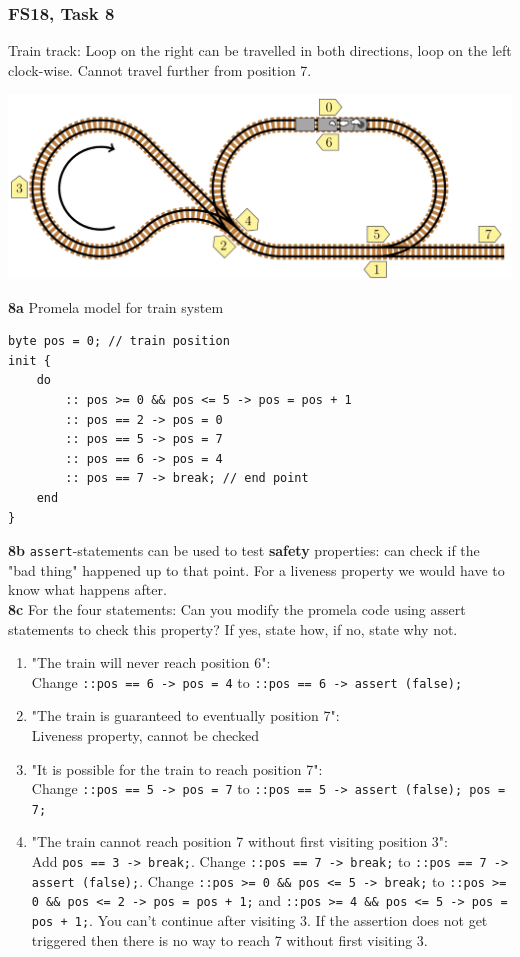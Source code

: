 \documentclass{article}
\begin{document}
\subsubsection{FS18, Task 8}
Train track: Loop on the right can be travelled in both directions, loop on the left clock-wise. Cannot travel further from position 7.
\begin{center}
    \includegraphics[scale=0.8]{fs18_t8.png}
\end{center}
\textbf{8a} Promela model for train system
\begin{verbatim}
byte pos = 0; // train position
init {
    do
        :: pos >= 0 && pos <= 5 -> pos = pos + 1
        :: pos == 2 -> pos = 0
        :: pos == 5 -> pos = 7
        :: pos == 6 -> pos = 4
        :: pos == 7 -> break; // end point
    end
}
\end{verbatim} 
\textbf{8b} \texttt{assert}-statements can be used to test \textbf{safety} properties: can check if the "bad thing" happened up to that point. For a liveness property we would have to know what happens after. \smallskip \\
\textbf{8c} For the four statements: Can you modify the promela code using assert statements to check this property? If yes, state how, if no, state why not. 
\begin{enumerate}
    \item "The train will never reach position 6": \\
    Change \texttt{::pos == 6 -> pos = 4} to \texttt{::pos == 6 -> assert (false);}
    \item "The train is guaranteed to eventually position 7":\\
    Liveness property, cannot be checked 
    \item "It is possible for the train to reach position 7": \\
    Change \texttt{::pos == 5 -> pos = 7} to \texttt{::pos == 5 -> assert (false); pos = 7;}
    \item "The train cannot reach position 7 without first visiting position 3": \\
    Add \texttt{pos == 3 -> break;}. Change \texttt{::pos == 7 -> break;} to \texttt{::pos == 7 -> assert (false);}. Change \texttt{::pos >= 0 \&\& pos <= 5 -> break;} to \texttt{::pos >= 0 \&\& pos <= 2 -> pos = pos + 1;} and  \texttt{::pos >= 4 \&\& pos <= 5 -> pos = pos + 1;}. You can't continue after visiting 3. If the assertion does not get triggered then there is no way to reach 7 without first visiting 3.
    
\end{enumerate}
\end{document}

